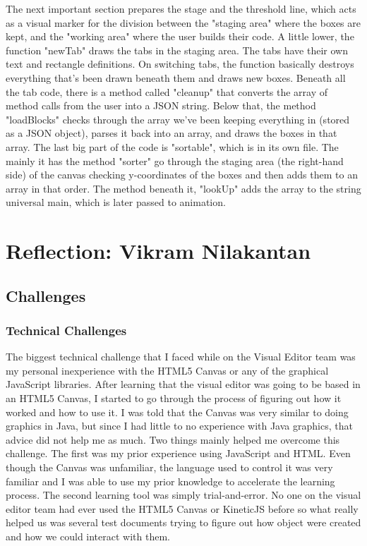 \documentclass[a4paper]{article}
\begin{document}
The next important section prepares the stage and the threshold line, which acts as a visual marker for the division between the "staging area" where the boxes are kept, and the "working area" where the user builds their code. A little lower, the function "newTab" draws the tabs in the staging area. The tabs have their own text and rectangle definitions. On switching tabs, the function basically destroys everything that's been drawn beneath them and draws new boxes. 
Beneath all the tab code, there is a method called "cleanup" that converts the array of method calls from the user into a JSON string. Below that, the method "loadBlocks" checks through the array we've been keeping everything in (stored as a JSON object), parses it back into an array, and draws the boxes in that array. The last big part of the code is "sortable", which is in its own file. The mainly it has the method "sorter" go through the staging area (the right-hand side) of the canvas checking y-coordinates of the boxes and then adds them to an array in that order. The method beneath it, "lookUp" adds the array to the string universal main, which is later passed to animation.


\section{Reflection: Vikram Nilakantan}
\subsection{Challenges}
\subsubsection{Technical Challenges}

The biggest technical challenge that I faced while on the Visual Editor team was my personal inexperience with the HTML5 Canvas or any of the graphical JavaScript libraries. After learning that the visual editor was going to be based in an HTML5 Canvas, I started to go through the process of figuring out how it worked and how to use it. I was told that the Canvas was very similar to doing graphics in Java, but since I had little to no experience with Java graphics, that advice did not help me as much. Two things mainly helped me overcome this challenge. The first was my prior experience using JavaScript and HTML. Even though the Canvas was unfamiliar, the language used to control it was very familiar and I was able to use my prior knowledge to accelerate the learning process. The second learning tool was simply trial-and-error. No one on the visual editor team had ever used the HTML5 Canvas or KineticJS before so what really helped us was several test documents trying to figure out how object were created and how we could interact with them. 
\end{document}
